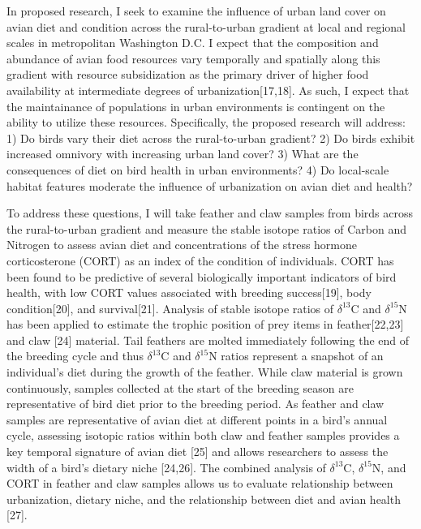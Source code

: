 \documentclass[12pt]{article}
\begin{document}
In proposed research, I seek to examine the influence of urban land cover on avian diet and condition across the rural-to-urban gradient at local and regional scales in metropolitan Washington D.C. I expect that the composition and abundance of avian food resources vary temporally and spatially along this gradient with resource subsidization as the primary driver of higher food availability at intermediate degrees of urbanization[17,18]. As such, I expect that the maintainance of populations in urban environments is contingent on the ability to utilize these resources. Specifically, the proposed research will address:  1) Do birds vary their diet across the rural-to-urban gradient? 2) Do birds exhibit increased omnivory with increasing urban land cover? 3) What are the consequences of diet on bird health in  urban environments? 4) Do local-scale habitat features moderate the influence of urbanization on avian diet and health? \par

To address these questions, I will take feather and claw samples from birds across the rural-to-urban gradient and measure the stable isotope ratios of Carbon and Nitrogen to assess avian diet and concentrations of the stress hormone corticosterone (CORT) as an index of the condition of individuals. CORT has been found to be predictive of several biologically important indicators of bird health, with low CORT values associated with breeding success[19], body condition[20], and survival[21]. Analysis of stable isotope ratios of $\delta^{13}$C and $\delta^{15}$N has been applied to estimate the trophic position of prey items in feather[22,23] and claw [24] material. Tail feathers are molted immediately following the end of the breeding cycle and thus $\delta^{13}$C and $\delta^{15}$N ratios represent a snapshot of an individual's diet during the growth of the feather. While claw material is grown continuously, samples collected at the start of the breeding season are representative of bird diet prior to the breeding period. As feather and claw samples are representative of avian diet at different points in a bird's annual cycle, assessing isotopic ratios within both claw and feather samples provides a key temporal signature of avian diet [25] and allows researchers to assess the width of a bird's dietary niche [24,26]. The combined analysis of $\delta^{13}$C, $\delta^{15}$N, and CORT in feather and claw samples allows us to evaluate relationship between urbanization, dietary niche, and the relationship between diet and avian health [27].\par
\end{document}
